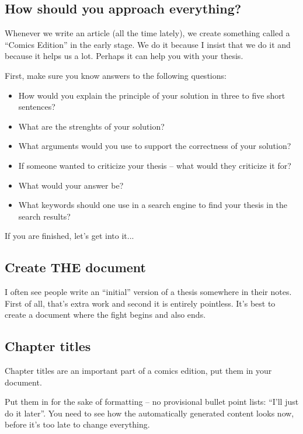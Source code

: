 {{\subsection*{How should you approach everything?}

Whenever we write an article (all the time lately), we create something called a ``Comics Edition'' in the early stage. We do it because I insist that we do it and because it helps us a lot. Perhaps it can help you with your thesis.

First, make sure you know answers to the following questions:
\begin{itemize}
  \item{How would you explain the principle of your solution in three to five short sentences?}
  \item{What are the strenghts of your solution?}
  \item{What arguments would you use to support the correctness of your solution?}
  \item{If someone wanted to criticize your thesis -- what would they criticize it for?}
  \item{What would your answer be?}
  \item{What keywords should one use in a search engine to find your thesis in the search results?}
\end{itemize}

If you are finished, let's get into it...

\subsection*{Create THE document}

I often see people write an ``initial'' version of a thesis somewhere in their notes. First of all, that's extra work and second it is entirely pointless. It's best to create a document where the fight begins and also ends.

\subsection*{Chapter titles}

Chapter titles are an important part of a comics edition, put them in your document.

Put them in for the sake of formatting -- no provisional bullet point lists: ``I'll just do it later''. You need to see how the automatically generated content looks now, before it's too late to change everything.

}}
